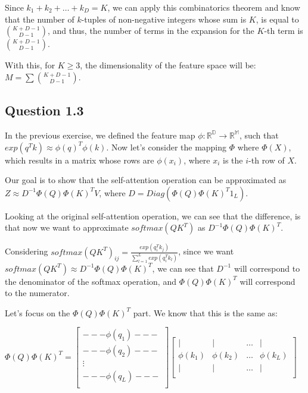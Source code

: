\documentclass{article}
\begin{document}
Since $k_1 + k_2 + \dots + k_D = K$, we can apply this combinatorics theorem and know that the number of $k$-tuples of non-negative integers whose sum is $K$, is equal to
$\binom{K + D - 1}{D - 1}$, and thus, the number of terms in the expansion for the $K$-th term is $\binom{K + D - 1}{D - 1}$.

\bigskip

With this, for $K \geq 3$, the dimensionality of the feature space will be: $M = \sum \binom{K + D - 1}{D - 1}$.

\subsection{Question 1.3}

In the previous exercise, we defined the feature map $\phi: \mathbb{R^D} \rightarrow \mathbb{R^M}$, such that $exp(q^Tk) \approx \phi(q)^T\phi(k)$. 
Now let's consider the mapping $\Phi$ where $\Phi(X)$, which results in a matrix whose rows are $\phi(x_i)$, where $x_i$ is the $i$-th row of $X$.

Our goal is to show that the self-attention operation can be approximated as $Z \approx D^{-1}\Phi(Q) \Phi(K)^T V$, 
where $D = Diag(\Phi(Q) \Phi(K)^T 1_L)$. 

Looking at the original self-attention operation, we can see that the difference, is that now we want to approximate
$softmax(QK^T)$ as $D^{-1}\Phi(Q) \Phi(K)^T$.

Considering $softmax(QK^T)_{ij} = \frac{exp(q_i^Tk_j)}{\sum_{l=1}^L exp(q_i^Tk_l)}$, since we want
$softmax(QK^T) \approx D^{-1}\Phi(Q) \Phi(K)^T$, we can see that $D^{-1}$ will correspond to the denominator of the softmax operation,
and $\Phi(Q) \Phi(K)^T$ will correspond to the numerator.

\bigskip

Let's focus on the $\Phi(Q) \Phi(K)^T$ part. We know that this is the same as:

\medskip

$
    \Phi(Q) \Phi(K)^T = 
    \begin{bmatrix}
        --- \phi(q_1) --- \\
        --- \phi(q_2) --- \\
        \vdots \\
        --- \phi(q_L) --- \\
    \end{bmatrix}
    \begin{bmatrix}
        | & | & \dots & | \\
        \phi(k_1) & \phi(k_2) & \dots & \phi(k_L) \\
        | & | & \dots & | \\
    \end{bmatrix}
$
\end{document}
